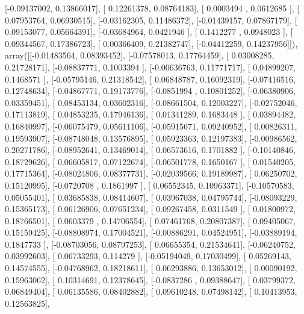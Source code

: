 \documentclass{article}
\begin{document}
       [-0.09137002,  0.13866017],
       [ 0.12261378,  0.08764183],
       [ 0.0003494 ,  0.0612685 ],
       [ 0.07953764,  0.06930515],
       [-0.03162305,  0.11486372],
       [-0.01439157,  0.07867179],
       [ 0.09153077,  0.05664391],
       [-0.03684964,  0.0421946 ],
       [ 0.1412277 ,  0.0948023 ],
       [ 0.09344567,  0.17386723],
       [ 0.00366409,  0.21382747],
       [-0.04412259,  0.14237956]]), array([[-0.01483564,  0.08393452],
       [-0.07578013,  0.17764459],
       [ 0.03008285,  0.21728171],
       [-0.08837771,  0.1003394 ],
       [-0.00636763,  0.11771717],
       [ 0.04899207,  0.1468571 ],
       [-0.05795146,  0.21318542],
       [ 0.06848787,  0.16092319],
       [-0.07416516,  0.12748634],
       [-0.04867771,  0.19173776],
       [-0.0851994 ,  0.10801252],
       [-0.06380906,  0.03359451],
       [ 0.08453134,  0.03602316],
       [-0.08661504,  0.12003227],
       [-0.02752046,  0.17113819],
       [ 0.04853235,  0.17946136],
       [ 0.01341289,  0.1683448 ],
       [ 0.03894482,  0.16840997],
       [-0.06075479,  0.05611106],
       [-0.05915671,  0.09240952],
       [ 0.00826311,  0.19593907],
       [-0.08748048,  0.13576895],
       [ 0.05923363,  0.12197383],
       [-0.00986562,  0.20271786],
       [-0.08952641,  0.13469014],
       [ 0.06573616,  0.1701882 ],
       [-0.10140846,  0.18729626],
       [ 0.06605817,  0.07122674],
       [-0.06501778,  0.1650167 ],
       [ 0.01540205,  0.17715364],
       [-0.08024806,  0.08377731],
       [-0.02039566,  0.19189987],
       [ 0.06250702,  0.15120995],
       [-0.0720708 ,  0.1861997 ],
       [ 0.06552345,  0.10963371],
       [-0.10570583,  0.05055401],
       [ 0.03685838,  0.08414607],
       [ 0.03967038,  0.04795744],
       [-0.08093229,  0.15365173],
       [ 0.06126906,  0.07651234],
       [ 0.09267458,  0.0311549 ],
       [ 0.01800972,  0.18766501],
       [ 0.0603379 ,  0.14706554],
       [ 0.07461768,  0.20807387],
       [ 0.09405067,  0.15159425],
       [-0.08808974,  0.17004521],
       [-0.00886291,  0.04524951],
       [-0.03889194,  0.1847733 ],
       [-0.08703056,  0.08797253],
       [ 0.06655354,  0.21534641],
       [-0.06240752,  0.03992603],
       [ 0.06733293,  0.114279  ],
       [-0.05194049,  0.17030499],
       [ 0.05269143,  0.14574555],
       [-0.04768962,  0.18218611],
       [ 0.06293886,  0.13653012],
       [ 0.00090192,  0.15963062],
       [ 0.10314691,  0.12378645],
       [-0.0837286 ,  0.09388647],
       [ 0.03799372,  0.06849404],
       [ 0.06135586,  0.08402882],
       [ 0.09610248,  0.07498142],
       [ 0.10413953,  0.12563825],
\end{document}
